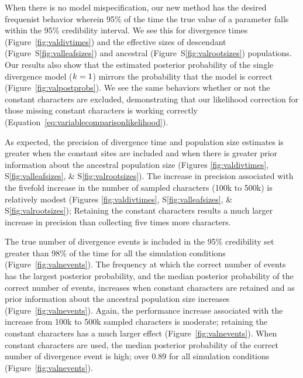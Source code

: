 When there is no model mispecification, our new method has the desired
frequenist behavior wherein 95\% of the time the true value of a parameter
falls within the 95\% credibility interval.
We see this for
divergence times
(Figure~\ref{fig:valdivtimes})
and the effective sizes of
descendant
(Figure~S\ref{fig:valleafsizes})
and ancestral
(Figure~S\ref{fig:valrootsizes})
populations.
Our results also show that the estimated posterior probability of the single
divergence model ($k_{} = 1$) mirrors the probability that the model
is correct 
(Figure~\ref{fig:valpostprobs}).
We see the same behaviors whether or not the constant characters are excluded,
demonstrating that our likelihood correction for those missing constant
characters is working correctly
(Equation~\ref{eq:variablecomparisonlikelihood}).

As expected, the precision of divergence time and population size estimates is
greater when the constant sites are included and when there is greater prior
information about the ancestral population size
(Figures \ref{fig:valdivtimes}, S\ref{fig:valleafsizes}, \&
S\ref{fig:valrootsizes}).
The increase in precision associated with the fivefold increase in the number
of sampled characters (100k to 500k) is relatively modest (Figures
\ref{fig:valdivtimes}, S\ref{fig:valleafsizes}, \& S\ref{fig:valrootsizes});
Retaining the constant characters results a much larger increase in precision
than collecting five times more characters.

The true number of divergence events is included in the 95\% credibility set
greater than 98\% of the time for all the simulation conditions
(Figure~\ref{fig:valnevents}).
The frequency at which the correct number of events has the largest posterior
probability, and the median posterior probability of the correct number of
events,
increases when constant characters are retained and as prior information about
the ancestral population size increases 
(Figure~\ref{fig:valnevents}).
Again, the performance increase associated with the increase from 100k to 500k
sampled characters is moderate; retaining the constant characters
has a much larger effect
(Figure~\ref{fig:valnevents}).
When constant characters are used, the median posterior
probability of the correct number of divergence event is high; over 0.89
for all simulation conditions
(Figure~\ref{fig:valnevents}).

